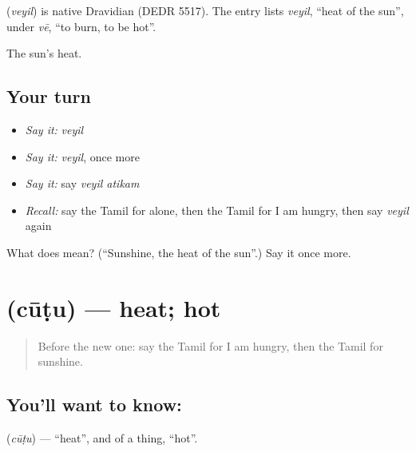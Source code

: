 \begin{cousinweb}
\textbf{} (\emph{veyil}) is native Dravidian (DEDR 5517). The entry lists \emph{veyil}, \textquotedblleft{}heat of the sun\textquotedblright{}, under \emph{vē}, \textquotedblleft{}to burn, to be hot\textquotedblright{}.
\end{cousinweb}

\begin{grammarlens}[title={What you've built}]
The sun's heat.
\end{grammarlens}

\subsection*{Your turn}
\begin{itemize}
\raggedright
  \item \emph{Say it:} \emph{veyil}
  \item \emph{Say it:} \emph{veyil}, once more
  \item \emph{Say it:} say \emph{veyil atikam}
  \item \emph{Recall:} say the Tamil for alone, then the Tamil for I am hungry, then say \emph{veyil} again
\end{itemize}

\begin{tcolorbox}[breakable,colback=teal!4,colframe=teal!35!black,title={Before you move on}]
What does  mean? (\textquotedblleft{}Sunshine, the heat of the sun\textquotedblright{}.) Say it once more.
\end{tcolorbox}
\section[\texorpdfstring{\ta{சூடு} (cūṭu)}{சூடு (cūṭu)}]{ (cūṭu) — heat; hot}

\label{lesson:TA-C91-heat}



\begin{quote}
Before the new one: say the Tamil for I am hungry, then the Tamil for sunshine.
\end{quote}

\subsection*{You'll want to know: }
\textbf{} (\emph{cūṭu}) — \textquotedblleft{}heat\textquotedblright{}, and of a thing, \textquotedblleft{}hot\textquotedblright{}.

